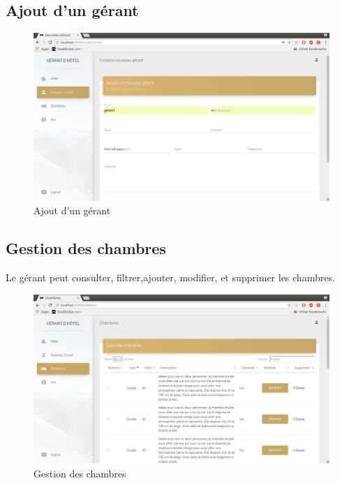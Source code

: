 \documentclass[12pt,a4paper]{report}
\begin{document}
	\subsection{Ajout d'un gérant}
	\begin{figure}[!hbtp]
		\centering
		\includegraphics[scale=0.3]{./graphics/nvg.png}
		\caption{Ajout d'un gérant}
		\end{figure}
		\newpage

	\subsection{Gestion des chambres}
Le gérant peut consulter, filtrer,ajouter, modifier, et supprimer les chambres.
	\begin{figure}[!hbtp]
		\centering
		\includegraphics[scale=0.3]{./graphics/chambres.png}
		\caption{Gestion des chambres}
		\end{figure}
		\newpage
\end{document}
